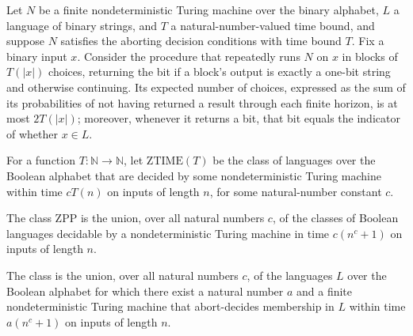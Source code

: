 \begin{theorem}
\label{Turing.FinNDTM.AbortDecidesInTime.restart}
\leanok
{}
Let $N$ be a finite nondeterministic Turing machine over the binary alphabet, $L$ a
language of binary strings, and $T$ a natural-number-valued time bound, and suppose $N$
satisfies the aborting decision conditions with time bound $T$. Fix a binary input $x$.
Consider the procedure that repeatedly runs $N$ on $x$ in blocks of $T(|x|)$ choices,
returning the bit if a block's output is exactly a one-bit string and otherwise
continuing. Its expected number of choices, expressed as the sum of its probabilities of
not having returned a result through each finite horizon, is at most $2T(|x|)$;
moreover, whenever it returns a bit, that bit equals the indicator of whether $x\in L$.
\end{theorem}

\begin{definition}
\label{Randomized.ZTIME}
\leanok
{}
For a function $T:\mathbb N\to\mathbb N$, let $\mathrm{ZTIME}(T)$ be the class of
languages over the Boolean alphabet that are decided by some nondeterministic Turing
machine within time $cT(n)$ on inputs of length $n$, for some natural-number constant
$c$.
\end{definition}

\begin{definition}
\label{Randomized.ZPP_PTM}
\leanok
{}
The class $\mathrm{ZPP}$ is the union, over all natural numbers $c$, of the classes of
Boolean languages decidable by a nondeterministic Turing machine in time $c(n^c+1)$ on
inputs of length $n$.
\end{definition}

\begin{definition}
\label{Randomized.ZPPAbort_PTM}
\leanok
{}
The class is the union, over all natural numbers $c$, of the languages $L$ over the
Boolean alphabet for which there exist a natural number $a$ and a finite
nondeterministic Turing machine that abort-decides membership in $L$ within time
$a(n^c+1)$ on inputs of length $n$.
\end{definition}

